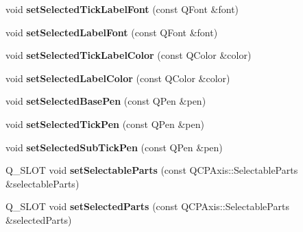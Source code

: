 \begin{DoxyCompactItemize}
\item 
void {\bfseries set\+Selected\+Tick\+Label\+Font} (const Q\+Font \&font)\hypertarget{class_q_c_p_axis_a845ccb560b7bc5281098a5be494145f6}{}\label{class_q_c_p_axis_a845ccb560b7bc5281098a5be494145f6}

\item 
void {\bfseries set\+Selected\+Label\+Font} (const Q\+Font \&font)\hypertarget{class_q_c_p_axis_a02ec2a75d4d8401eaab834fbc6803d30}{}\label{class_q_c_p_axis_a02ec2a75d4d8401eaab834fbc6803d30}

\item 
void {\bfseries set\+Selected\+Tick\+Label\+Color} (const Q\+Color \&color)\hypertarget{class_q_c_p_axis_a9bdbf5e63ab15187f3a1de9440129227}{}\label{class_q_c_p_axis_a9bdbf5e63ab15187f3a1de9440129227}

\item 
void {\bfseries set\+Selected\+Label\+Color} (const Q\+Color \&color)\hypertarget{class_q_c_p_axis_a5d502dec597c634f491fdd73d151c72d}{}\label{class_q_c_p_axis_a5d502dec597c634f491fdd73d151c72d}

\item 
void {\bfseries set\+Selected\+Base\+Pen} (const Q\+Pen \&pen)\hypertarget{class_q_c_p_axis_aeb917a909215605b95ef2be843de1ee8}{}\label{class_q_c_p_axis_aeb917a909215605b95ef2be843de1ee8}

\item 
void {\bfseries set\+Selected\+Tick\+Pen} (const Q\+Pen \&pen)\hypertarget{class_q_c_p_axis_a8360502685eb782edbf04019c9345cdc}{}\label{class_q_c_p_axis_a8360502685eb782edbf04019c9345cdc}

\item 
void {\bfseries set\+Selected\+Sub\+Tick\+Pen} (const Q\+Pen \&pen)\hypertarget{class_q_c_p_axis_a2a00a7166600155eac26843132eb9576}{}\label{class_q_c_p_axis_a2a00a7166600155eac26843132eb9576}

\item 
Q\+\_\+\+S\+L\+OT void {\bfseries set\+Selectable\+Parts} (const Q\+C\+P\+Axis\+::\+Selectable\+Parts \&selectable\+Parts)\hypertarget{class_q_c_p_axis_ab2d5ab07ad9e7f0e5529e1fb5d00712e}{}\label{class_q_c_p_axis_ab2d5ab07ad9e7f0e5529e1fb5d00712e}

\item 
Q\+\_\+\+S\+L\+OT void {\bfseries set\+Selected\+Parts} (const Q\+C\+P\+Axis\+::\+Selectable\+Parts \&selected\+Parts)\hypertarget{class_q_c_p_axis_a816a132715d851b7016c9740b880464c}{}\label{class_q_c_p_axis_a816a132715d851b7016c9740b880464c}


\end{DoxyCompactItemize}

